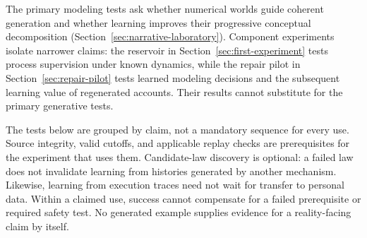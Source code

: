 \documentclass[10pt]{article}
\begin{document}
The primary modeling tests ask whether numerical worlds guide coherent
generation and whether learning improves their progressive conceptual
decomposition (Section~\ref{sec:narrative-laboratory}). Component experiments
isolate narrower claims: the reservoir in Section~\ref{sec:first-experiment} tests process supervision under
known dynamics, while the repair pilot in Section~\ref{sec:repair-pilot} tests
learned modeling decisions and the subsequent learning value of regenerated
accounts. Their results cannot substitute for the primary generative tests.

The tests below are grouped by claim, not a mandatory sequence for every use.
Source integrity, valid cutoffs, and applicable replay checks are prerequisites
for the experiment that uses them. Candidate-law discovery is optional: a
failed law does not invalidate learning from histories generated by another
mechanism. Likewise, learning from execution traces need not wait for transfer
to personal data. Within a claimed use, success cannot compensate for a failed
prerequisite or required safety test. No generated example supplies evidence
for a reality-facing claim by itself.
\end{document}
